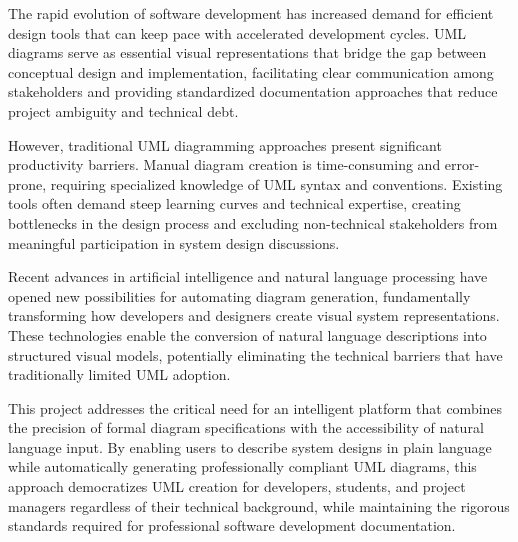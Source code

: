 \documentclass[a4paper,12pt]{report}
\begin{document}
The rapid evolution of software development has increased demand for efficient design tools that can keep pace with accelerated development cycles. UML diagrams serve as essential visual representations that bridge the gap between conceptual design and implementation, facilitating clear communication among stakeholders and providing standardized documentation approaches that reduce project ambiguity and technical debt.

However, traditional UML diagramming approaches present significant productivity barriers. Manual diagram creation is time-consuming and error-prone, requiring specialized knowledge of UML syntax and conventions. Existing tools often demand steep learning curves and technical expertise, creating bottlenecks in the design process and excluding non-technical stakeholders from meaningful participation in system design discussions.

Recent advances in artificial intelligence and natural language processing have opened new possibilities for automating diagram generation, fundamentally transforming how developers and designers create visual system representations. These technologies enable the conversion of natural language descriptions into structured visual models, potentially eliminating the technical barriers that have traditionally limited UML adoption.

This project addresses the critical need for an intelligent platform that combines the precision of formal diagram specifications with the accessibility of natural language input. By enabling users to describe system designs in plain language while automatically generating professionally compliant UML diagrams, this approach democratizes UML creation for developers, students, and project managers regardless of their technical background, while maintaining the rigorous standards required for professional software development documentation.





















% 




\end{document}
